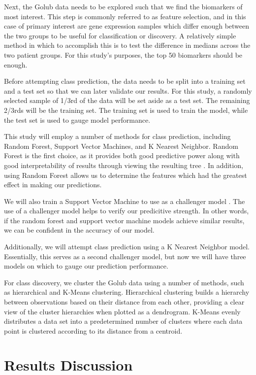 \documentclass{article}
\begin{document}
Next, the Golub data needs to be explored such that we find the
biomarkers of most interest. This step is commonly referred to as
feature selection, and in this case of primary interest are gene
expression samples which differ enough between the two groups to be
useful for classification or discovery. A relatively simple method in
which to accomplish this is to test the difference in medians across
the two patient groups. For this study's purposes, the top 50
biomarkers should be enough.

Before attempting class prediction, the data needs to be split into a
training set and a test set so that we can later validate our
results. For this study, a randomly selected sample of 1/3rd of the
data will be set aside as a test set. The remaining 2/3rds will be the
training set. The training set is used to train the model, while the
test set is used to gauge model performance.

This study will employ a number of methods for class prediction,
including Random Forest, Support Vector Machines, and K Nearest
Neighbor. Random Forest is the first choice, as it provides both good
predictive power along with good interpretability of results through
viewing the resulting tree \autocite{liaw2002classification,
  diaz2006gene}.  In addition, using Random Forest allows us to
determine the features which had the greatest effect in making our
predictions.

We will also train a Support Vector Machine to use as a challenger
model \autocite{scholkopf2001learning}. The use of a challenger model
helps to verify our predicitive strength. In other words, if the
random forest and support vector machine models achieve similar
results, we can be confident in the accuracy of our model.

Additionally, we will attempt class prediction using a K Nearest
Neighbor model. Essentially, this serves as a second challenger model,
but now we will have three models on which to gauge our prediction
performance.

For class discovery, we cluster the Golub data using a number of
methods, such as hierarchical and K-Means clustering. Hierarchical
clustering builds a hierarchy between observations based on their
distance from each other, providing a clear view of the cluster
hierarchies when plotted as a dendrogram. K-Means evenly distributes a
data set into a predetermined number of clusters where each data point
is clustered according to its distance from a centroid.


\section{Results Discussion}
\end{document}
